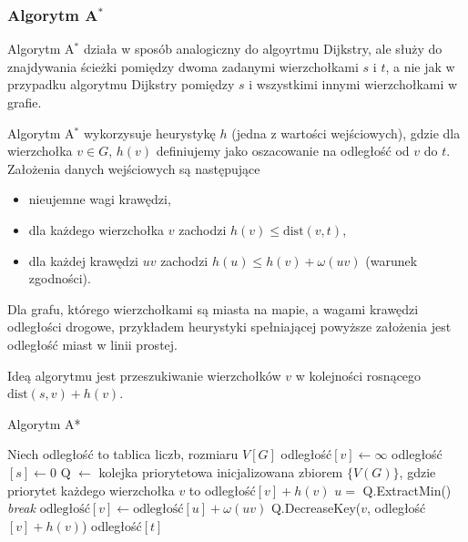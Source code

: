 \subsubsection{Algorytm A\texorpdfstring{$^*$}{TEXT}}
Algorytm A$^*$ działa w sposób analogiczny do algoyrtmu Dijkstry, 
ale służy do znajdywania ścieżki pomiędzy dwoma zadanymi wierzchołkami
$s$ i $t$, a nie jak w przypadku algorytmu Dijkstry pomiędzy $s$
i wszystkimi innymi wierzchołkami w grafie.

Algorytm A$^*$ wykorzysuje heurystykę $h$ (jedna z wartości 
wejściowych), gdzie dla wierzchołka
$v \in G$, $h(v)$ definiujemy jako oszacowanie
na odległość od $v$ do $t$. Założenia danych wejściowych są następujące
\begin{itemize}
	\item nieujemne wagi krawędzi,
	\item dla każdego wierzchołka $v$ zachodzi $h(v) \leq \text{dist}(v, t)$,
	\item dla każdej krawędzi $uv$ zachodzi $h(u) \leq h(v) + \omega(uv)$ (warunek zgodności).
\end{itemize}
Dla grafu, którego wierzchołkami są miasta na mapie, a wagami krawędzi odległości drogowe, przykładem heurystyki spełniającej powyższe założenia jest odległość miast w linii prostej.

 Ideą algorytmu jest przeszukiwanie wierzchołków $v$ w kolejności 
rosnącego $\text{dist}(s,v) + h(v)$. 

\begin{algorithm}[H]
	\caption{Algorytm A*}
	\begin{algorithmic}[1]
		\State Niech odległość to tablica liczb, rozmiaru $V[G]$
		\State odległość$[v]\gets\infty$
		\EndFor
		\State odległość$[s]\gets 0$
		\State Q $\gets$ kolejka priorytetowa inicjalizowana 
		zbiorem $\{V(G)\}$, gdzie priorytet każdego wierzchołka $v$
		to odległość$[v] + h(v)$
		\State $u =$ Q.ExtractMin()
		\State \textit{break}
		\EndIf
		\State $\text{odległość}[v] \gets \text{odległość}[u] + \omega(uv)$
		\State Q.DecreaseKey($v$, odległość$[v] + h(v)$)
		\EndIf
		\EndFor
		\EndWhile
		\State \Return odległość$[t]$
		\EndProcedure
	\end{algorithmic}
	\label{aStar_alg}
\end{algorithm}

